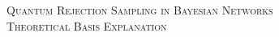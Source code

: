 \documentclass{article}
\author{Thierry Rioual, Tibor Dubois}
\date{June 2024}
\begin{document}
\begin{adjustbox}{minipage=1.2\textwidth, center}
\begin{center}
\textsc{\Large Quantum Rejection Sampling in Bayesian Networks}
\\[5pt]
\textsc{\large Theoretical Basis Explanation} 
\\[5pt]
\\[5pt]
\small {}
\\
\small {}
\end{center}
\end{adjustbox}









\printbibliography
\end{document}
